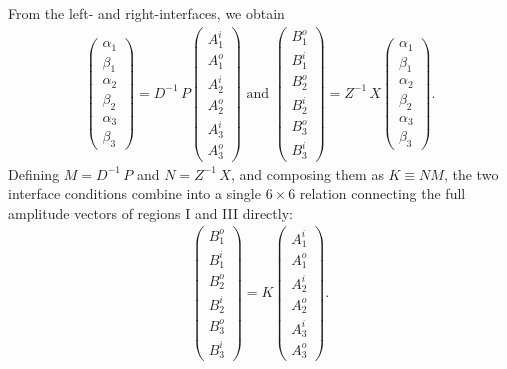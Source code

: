 \documentclass[aps,prb,onecolumn,longbibliography,nofootinbib,citeautoscript,10pt]{revtex4-2}
\begin{document}
From the left- and right-interfaces, we obtain
\begin{align}
\begin{pmatrix}
\alpha_1\\ \beta_1\\ \alpha_2\\ \beta_2 \\ \alpha_3\\ \beta_3
\end{pmatrix}
= D^{-1} \, P
\begin{pmatrix}
A_1^i\\ A_1^o\\ A_2^i\\ A_2^o\\ A_3^i\\ A_3^o
\end{pmatrix} \text{ and }
\begin{pmatrix}
B_1^o\\B_1^i\\ B_2^o\\ B_2^i\\ B_3^o\\ B_3^i
\end{pmatrix}
= Z^{-1} \, X
\begin{pmatrix}
\alpha_1\\ \beta_1\\ \alpha_2\\ \beta_2\\ \alpha_3\\ \beta_3
\end{pmatrix}.
\end{align}
Defining $M=D^{-1} \, P$ and $N=Z^{-1} \, X$, and composing them as $K \equiv NM$, the two interface conditions combine into a single $6\times6$ relation connecting the full amplitude vectors of regions I and III directly:
\begin{align}
\begin{pmatrix}
B_1^o\\B_1^i\\B_2^o\\B_2^i\\B_3^o\\B_3^i
\end{pmatrix}
= K
\begin{pmatrix}
A_1^i\\A_1^o\\A_2^i\\A_2^o\\A_3^i\\A_3^o
\end{pmatrix}.
\end{align}
\end{document}
